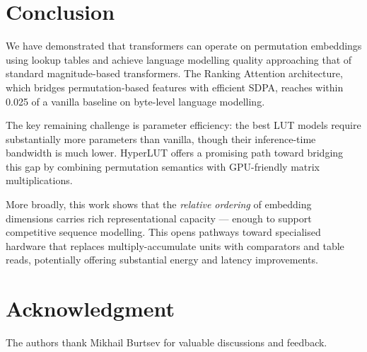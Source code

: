 \documentclass[11pt]{article}
\begin{document}
\section{Conclusion}
\label{sec:conclusion}

We have demonstrated that transformers can operate on permutation embeddings using lookup tables and achieve language modelling quality approaching that of standard magnitude-based transformers.
The Ranking Attention architecture, which bridges permutation-based features with efficient SDPA, reaches within 0.025 of a vanilla baseline on byte-level language modelling.

The key remaining challenge is parameter efficiency: the best LUT models require substantially more parameters than vanilla, though their inference-time bandwidth is much lower.
HyperLUT offers a promising path toward bridging this gap by combining permutation semantics with GPU-friendly matrix multiplications.

More broadly, this work shows that the \emph{relative ordering} of embedding dimensions carries rich representational capacity --- enough to support competitive sequence modelling.
This opens pathways toward specialised hardware that replaces multiply-accumulate units with comparators and table reads, potentially offering substantial energy and latency improvements.


\section*{Acknowledgment}

The authors thank Mikhail Burtsev for valuable discussions and feedback.
\end{document}
